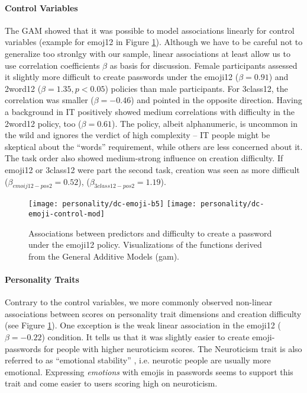 \paragraph{Control Variables} 
The GAM showed that it was possible to model associations linearly for control variables (example for emoj12 in Figure \ref{fig:personality:dc-emoji-b5}). Although we have to be careful not to generalize too stronlgy with our sample, linear associations at least allow us to use correlation coefficients $\beta$ as basis for discussion.
Female participants assessed it slightly more difficult to create passwords under the emoji12 ($\beta=0.91$) and 2word12 ($\beta=1.35, p<0.05$) policies than male participants. For 3class12, the correlation was smaller ($\beta=-0.46$) and pointed in the opposite direction. 
Having a background in IT positively showed medium correlations with difficulty in the 2word12 policy, too ($\beta=0.61$). The policy, albeit alphanumeric, is uncommon in the wild and ignores the verdict of high complexity -- IT people might be skeptical about the ``words'' requirement, while others are less concerned about it.
The task order also showed medium-strong influence on creation difficulty. If emoji12 or 3class12 were part the second task, creation was seen as more difficult ($\beta_{emoij12-pos2}=0.52$),  ($\beta_{3class12-pos2}=1.19$). 


\begin{figure}
\texttt{[image: personality/dc-emoji-b5]}
\texttt{[image: personality/dc-emoji-control-mod]}
\caption{\label{fig:personality:dc-emoji-b5}Associations between predictors and difficulty to create a password under the emoji12 policy. Visualizations of the functions derived from the General Additive Models (gam).}
\end{figure}
\paragraph{Personality Traits}
Contrary to the control variables, we more commonly observed non-linear associations between scores on personality trait dimensions and creation difficulty (see Figure \ref{fig:personality:dc-emoji-b5}).
One exception is the weak linear association in the emoji12 ($\beta=-0.22$) condition. It tells us that it was slightly easier to create emoji-passwords for people with higher neuroticism scores. The Neuroticism trait is also referred to as ``emotional stability'' \cite{Costa1992NEO}, i.e. neurotic people are usually more emotional. Expressing \textit{emotions} with emojis in passwords seems to support this trait and come easier to users scoring high on neuroticism. %

